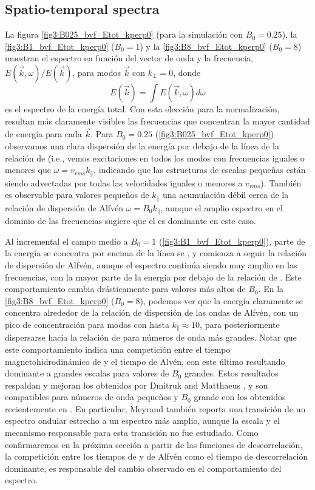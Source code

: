 \subsection{Spatio-temporal spectra}

La figura \cref{fig3:B025_bvf_Etot_kperp0} (para la simulación con
$B_0=0.25$), la \cref{fig3:B1_bvf_Etot_kperp0} ($B_0=1$) y la
\cref{fig3:B8_bvf_Etot_kperp0} ($B_0=8$) muestran el espectro en
función del vector de onda y la frecuencia, $E(\vec{k},
\omega)/E(\vec{k})$, para modos $\vec{k}$ con $k_\perp = 0$, donde
\begin{equation}
  E(\vec{k})=\int E(\vec{k},\omega)d\omega
\end{equation}
es el espectro de la energía total. Con esta elección para la
normalización, resultan más claramente visibles las frecuencias que
concentran la mayor cantidad de energía para cada $\vec{k}$. Para
$B_0=0.25$ (\cref{fig3:B025_bvf_Etot_kperp0}) observamos una clara
dispersión de la energía por debajo de la línea de la relación de
\sweeping (i.e., vemos excitaciones en todos los modos con frecuencias
iguales o menores que $\omega = v_{rms} k_\parallel$, indicando que
las estructuras de escalas pequeñas están siendo advectadas por todas
las velocidades iguales o menores a $v_{rms}$).  También es observable
para valores pequeños de $k_\parallel$ una acumulación débil cerca de
la relación de dispersión de Alfvén $\omega = B_0 k_\parallel$, aunque
el amplio espectro en el dominio de las frecuencias sugiere que el
\sweeping es dominante en este caso.

Al incremental el campo medio a $B_0=1$
(\cref{fig3:B1_bvf_Etot_kperp0}), parte de la energía se concentra por
encima de la línea se \sweeping, y comienza a seguir la relación de
dispersión de Alfvén, aunque el espectro continúa siendo muy amplio en
las frecuencias, con la mayor parte de la energía por debajo de la
relación de \sweeping.  Este comportamiento cambia drásticamente para
valores más altos de $B_0$.  En la \cref{fig3:B8_bvf_Etot_kperp0}
($B_0=8$), podemos ver que la energía claramente se concentra
alrededor de la relación de dispersión de las ondas de Alfvén, con un
pico de concentración para modos con hasta $k_\parallel \approx 10$,
para posteriormente dispersarse hacia la relación de \sweeping para
números de onda más grandes.  Notar que este comportamiento indica una
competición entre el tiempo magnetohidrodinámico de \sweeping y el
tiempo de Alvén, con este último resultando dominante a grandes
escalas para valores de $B_0$ grandes. Estos resultados respaldan y
mejoran los obtenidos por Dmitruk and Matthaeus
\cite{dmitruk_waves_2009}, y son compatibles para números de onda
pequeños y $B_0$ grande con los obtenidos recientemente en
\cite{meyrand_direct_2016, meyrand_weak_2015}. En particular, Meyrand
\cite{meyrand_direct_2016} también reporta una transición de un
espectro ondular estrecho a un espectro más amplio, aunque la escala y
el mecanismo responsable para esta transición no fue estudiado. Como
confirmaremos en la próxima sección a partir de las funciones de
descorrelación, la competición entre los tiempos de \sweeping y de
Alfvén como el tiempo de descorrelación dominante, es responsable del
cambio observado en el comportamiento del espectro.

